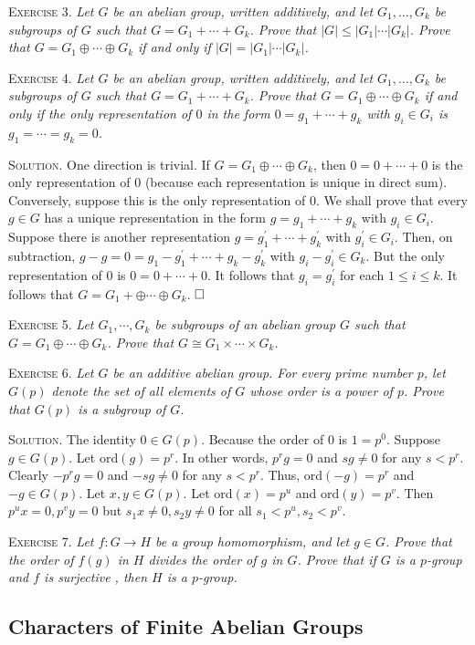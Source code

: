 \documentclass[11pt, leqno]{article}
\newcommand{\done}{\ensuremath{\hfill\square}}
\begin{document}
\textsc{Exercise 3}. \emph{Let $G$ be an abelian group, written additively, and let $G_1, \ldots, G_k$ be subgroups of $G$ such that $G = G_1 + \cdots + G_k$. Prove that $|G| \leq |G_1|\cdots |G_k|$. Prove that $G = G_1 \oplus \cdots \oplus G_k$ if and only if $|G| = |G_1|\cdots |G_k|$.}

\textsc{Exercise 4}. \emph{Let $G$ be an abelian group, written additively, and let $G_1, \ldots, G_k$ be subgroups of $G$ such that $G = G_1 + \cdots + G_k$. Prove that $G = G_1 \oplus \cdots \oplus G_k$ if and only if the only representation of $0$ in the form $0 = g_1 + \cdots + g_k$ with $g_i \in G_i$ is $g_1 = \cdots = g_k = 0$.}

\textsc{Solution}. One direction is trivial. If $G = G_1 \oplus \cdots \oplus G_k$, then $0 = 0 + \cdots + 0$ is the only representation of $0$ (because each representation is unique in direct sum). Conversely, suppose this is the only representation of $0$. We shall prove that every $g \in G$ has a unique representation in the form $g = g_1 + \cdots + g_k$ with $g_i \in G_i$. Suppose there is another representation $g = g_1^{\prime} + \cdots + g_k^{\prime}$ with $g_i^{\prime} \in G_i$. Then, on subtraction, $g - g = 0 = g_1 - g_1^{\prime} + \cdots + g_k - g_k^{\prime}$ with $g_i - g_i^{\prime} \in G_k$. But the only representation of $0$ is $0 = 0 + \cdots + 0$. It follows that $g_i = g_i^{\prime}$ for each $1 \leq i \leq k$. It follows that $G = G_1 + \oplus \cdots \oplus G_k$. \done

\textsc{Exercise 5}. \emph{Let $G_1, \cdots, G_k$ be subgroups of an abelian group $G$ such that $G = G_1 \oplus \cdots \oplus G_k$. Prove that $G \cong G_1 \times \cdots \times G_k$.}

\textsc{Exercise 6}. \emph{Let $G$ be an additive abelian group. For every prime number $p$, let $G(p)$ denote the set of all elements of $G$ whose order is a power of $p$. Prove that $G(p)$ is a subgroup of $G$.}

\textsc{Solution}. The identity $0 \in G(p)$. Because the order of $0$ is $1 = p^0$. Suppose $g \in G(p)$. Let ord$(g) = p^r$. In other words, $p^rg = 0$ and $sg \ne 0$ for any $s < p^r$. Clearly $-p^rg = 0$ and $-sg \ne 0$ for any $s < p^r$. Thus, ord$(-g) = p^r$ and $-g \in G(p)$. Let $x, y \in G(p)$. Let ord$(x) = p^u$ and ord$(y) = p^v$. Then $p^ux = 0, p^vy = 0$ but $s_1x \ne 0, s_2y \ne 0$ for all $s_1 < p^u, s_2 < p^v$.

\textsc{Exercise 7}. \emph{Let $f: G \to H$ be a group homomorphism, and let $g\in G$. Prove that the order of $f(g)$ in $H$ divides the order of $g$ in $G$. Prove that if $G$ is a $p$-group and $f$ is surjective , then $H$ is a $p$-group.}

\subsection{Characters of Finite Abelian Groups}
\end{document}
